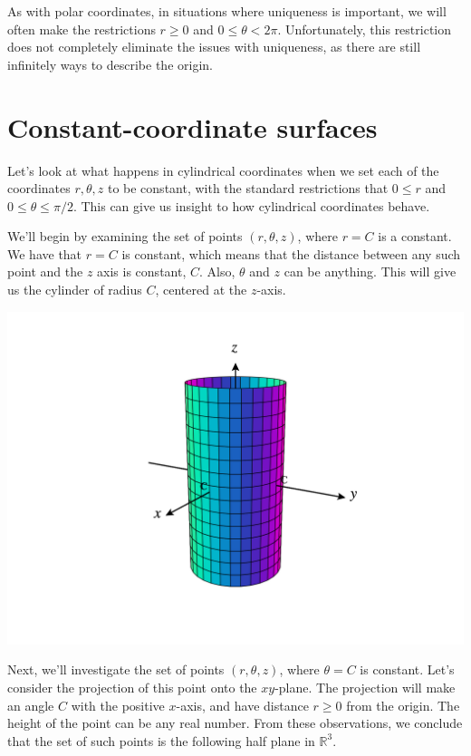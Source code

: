 \documentclass{ximera}
\begin{document}
As with polar coordinates, in situations where uniqueness is important, we will often make the restrictions $r\geq 0$ and $0\leq\theta<2\pi$. Unfortunately, this restriction does not completely eliminate the issues with uniqueness, as there are still infinitely ways to describe the origin.

\section*{Constant-coordinate surfaces}

Let's look at what happens in cylindrical coordinates when we set each of the coordinates $r,\theta,z$ to be constant, with the standard restrictions that $0\leq r$ and $0\leq \theta\leq \pi/2$. This can give us insight to how cylindrical coordinates behave.

We'll begin by examining the set of points $(r,\theta, z)$, where $r=C$ is a constant. We have that $r=C$ is constant, which means that the distance between any such point and the $z$ axis is constant, $C$. Also, $\theta$ and $z$ can be anything. This will give us the cylinder of radius $C$, centered at the $z$-axis.

\begin{image}
\includegraphics[width=\textwidth]{CalcPlot3D-r_constant}
\end{image}

Next, we'll investigate the set of points $(r,\theta,z)$, where $\theta = C$ is constant. Let's consider the projection of this point onto the $xy$-plane. The projection will make an angle $C$ with the positive $x$-axis, and have distance $r\geq 0$ from the origin. The height of the point can be any real number. From these observations, we conclude that the set of such points is the following half plane in $\mathbb{R}^3$.
\end{document}
